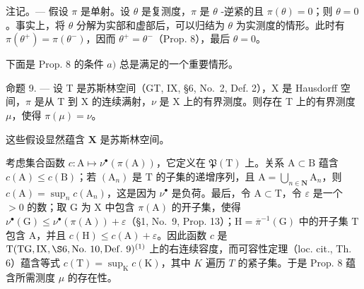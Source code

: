 注记。--- 假设 \(\pi\) 是单射。设 \(\theta\) 是复测度，\(\pi\) 是 \(\theta\) -逆紧的且 \(\pi(\theta)=0\)；则 \(\theta=0\)。事实上，将 \(\theta\) 分解为实部和虚部后，可以归结为 \(\theta\) 为实测度的情形。此时有 \(\pi(\theta^{+})=\pi(\theta^{-})\)，因而 \(\theta^{+}=\theta^{-}\)（Prop. 8），最后 \(\theta=0\)。

下面是 Prop. 8 的条件 \(a)\) 总是满足的一个重要情形。

命题 9. --- 设 T 是苏斯林空间（GT, IX, §6, No.~2, Def. 2），X 是 Hausdorff 空间，\(\pi\) 是从 T 到 X 的连续满射，\(\nu\) 是 X 上的有界测度。则存在 T 上的有界测度 \(\mu\)，使得 \(\pi(\mu) = \nu\)。

这些假设显然蕴含 \(\mathbf{X}\) 是苏斯林空间。

考虑集合函数 \(c: \mathrm{A} \mapsto \nu^{\bullet}(\pi(\mathrm{A}))\)，它定义在 \(\mathfrak{P}(\mathrm{T})\) 上。关系 \(\mathrm{A} \subset \mathrm{B}\) 蕴含 \(c(\mathrm{A}) \leqslant c(\mathrm{B})\)；若 \((\mathrm{A}_n)\) 是 \(\mathrm{T}\) 的子集的递增序列，且 \(\mathrm{A} = \bigcup_{n \in \mathbf{N}} \mathrm{A}_n\)，则 \(c(\mathrm{A}) = \sup_n c(\mathrm{A}_n)\)，这是因为 \(\nu^{\bullet}\) 是负荷。最后，令 \(\mathrm{A} \subset \mathrm{T}\)，令 \(\varepsilon\) 是一个 \(> 0\) 的数；取 \(\mathrm{G}\) 为 \(\mathrm{X}\) 中包含 \(\pi(\mathrm{A})\) 的开子集，使得 \(\nu^{\bullet}(\mathrm{G}) \leqslant \nu^{\bullet}(\pi(\mathrm{A})) + \varepsilon\)（§1, No.~9, Prop. 13）；\(\mathrm{H} = \overline{\pi}^{-1}(\mathrm{G})\) 中的开子集 \(\mathrm{T}\) 包含 \(\mathrm{A}\)，并且 \(c(\mathrm{H}) \leqslant c(\mathrm{A}) + \varepsilon\)。因此函数 \(c\) 是 \(\mathrm{T} (\mathrm{TG},\mathrm{IX},\S 6,\mathrm{No.~10},\mathrm{Def.~9})^{(1)}\) 上的右连续容度，而可容性定理（loc. cit., Th. 6）蕴含等式 \(c(\mathrm{T}) = \sup_{\mathrm{K}}c(\mathrm{K})\)，其中 \(K\) 遍历 \(T\) 的紧子集。于是 Prop. 8 蕴含所需测度 \(\mu\) 的存在性。

